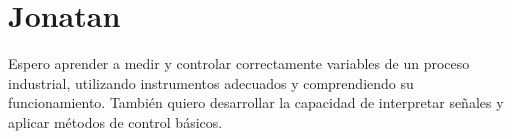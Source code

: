 \section{Jonatan}
Espero aprender a medir y controlar correctamente variables de un proceso industrial, utilizando instrumentos adecuados y comprendiendo su funcionamiento. También quiero desarrollar la capacidad de interpretar señales y aplicar métodos de control básicos.